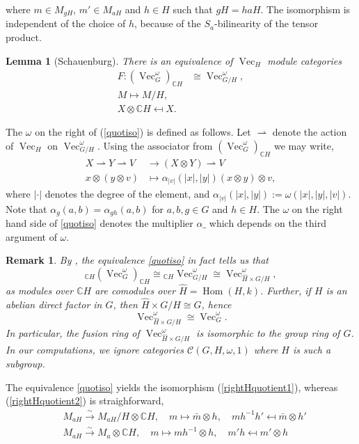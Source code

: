 \documentclass[11pt]{book}
\newtheorem{Lem}[theorem]{Lemma}
\theoremstyle{Rem}
\newtheorem{Rem}[theorem]{Remark}
\theoremstyle{definition}
\numberwithin{equation}{section}
\newcommand\inv{^{-1}}
\newcommand\Vect{\operatorname{Vec}}
\newcommand\Hom{\operatorname{Hom}}
\newcommand\CC{\mathbb C}
\newcommand\C{\mathcal C}
\begin{document}
where $m \in M_{gH}$, $m' \in M_{aH}$ and $h \in H$ such that $gH=haH$.  The isomorphism is independent of the choice of $h$, because of the $S_a$-bilinearity of the tensor product. 
\begin{Lem}[Schauenburg]\label{equiv}
There is an equivalence of $\Vect_H$ module categories
\begin{align}
	F: (\Vect^\omega_G)_{\CC H} &\cong \Vect^\omega_{G/H},\label{quotiso}\\	
	M\mapsto M/H\nonumber,\\
	X\otimes \CC H \mapsfrom X.\nonumber
\end{align}
\end{Lem}
The $\omega$ on the right of (\ref{quotiso}) is defined as follows.  Let $\rightharpoonup$ denote the action of $\Vect_H$ on $\Vect^\omega_{G/H}$. Using the associator from $(\Vect^\omega_G)_{\CC H}$ we may write,
\begin{align}
	X \rightharpoonup Y \rightharpoonup V &\rightarrow (X\otimes Y) \rightharpoonup V\\
	x\otimes (y \otimes v) &\mapsto \alpha_{|v|} (|x|, |y|)(x\otimes y)\otimes v,
\end{align}
where $|\cdot|$ denotes the degree of the element, and $\alpha_{|v|} (|x|, |y|) := \omega(|x|, |y|, |v|)$. Note that $\alpha_g(a, b) = \alpha_{gh}(a,b)$ for $a,b,g\in G$ and $h \in H$. The $\omega$ on the right hand side of \ref{quotiso} denotes the multiplier $\alpha\_$ which depends on the third argument of $\omega$.
\begin{Rem}\label{directfactor}
By \cite{Schauenburg_2015}, the equivalence \ref{quotiso} in fact tells us that \begin{equation}
	{}_{\CC H} (\Vect^\omega_G)_{\CC H} \cong {}_{\CC H}\Vect^\omega_{G/H} \cong  \Vect^\omega_{\hat{H} \times G/H },
\end{equation}
as modules over $\CC H$ are comodules over  $\hat{H}= \Hom(H, k)$. Further, if $H$ is an abelian direct factor in $G$, then $
\hat{H} \times G/H\cong G$, hence
\begin{equation}
	\Vect^\omega_{\hat{H} \times G/H} \cong \Vect^\omega_{G}.
\end{equation}
In particular, the fusion ring of $\Vect^\omega_{\hat{H} \times G/H}$ is isomorphic to the group ring of $G$. In our computations, we ignore categories $\C(G, H, \omega, 1)$ where $H$ is such a subgroup.
\end{Rem}	
The equivalence \ref{quotiso} yields the isomorphism (\ref{rightHquotient1}), whereas (\ref{rightHquotient2}) is straighforward,
\begin{align}
\label{rightHquotient1} &M_{aH} \overset{\sim} \longrightarrow M_{aH}/H \otimes \CC H, \quad 
m \mapsto \bar{m} \otimes h, 
 \quad mh\inv h' \mapsfrom \bar{m}\otimes h'  \\  \label{rightHquotient2} &M_{aH} \overset{\sim}\longrightarrow M_a \otimes \CC H,\quad  m\mapsto  mh\inv\otimes h, \quad m'h \mapsfrom m'\otimes h
 \end{align}
\end{document}

